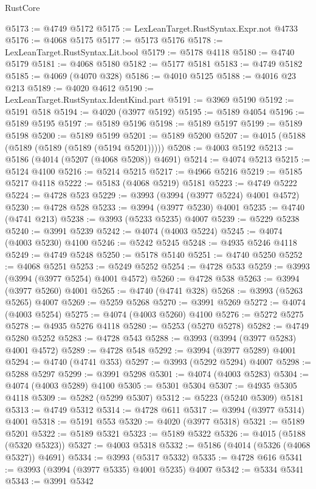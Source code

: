\begin{lexlean}{RustCore}
\begin{coremodule}
@5173 := @4749 @5172
@5175 := LexLeanTarget.RustSyntax.Expr.not @4733
@5176 := @4068 @5175
@5177 := @5173 @5176
@5178 := LexLeanTarget.RustSyntax.Lit.bool
@5179 := @5178 @4118
@5180 := @4740 @5179
@5181 := @4068 @5180
@5182 := @5177 @5181
@5183 := @4749 @5182
@5185 := @4069 (@4070 @328)
@5186 := @4010 @5125
@5188 := @4016 @23 @213
@5189 := @4020 @4612
@5190 := LexLeanTarget.RustSyntax.IdentKind.part
@5191 := @3969 @5190
@5192 := @5191 @518
@5194 := @4020 (@3977 @5192)
@5195 := @5189 @4054
@5196 := @5189 @5195
@5197 := @5189 @5196
@5198 := @5189 @5197
@5199 := @5189 @5198
@5200 := @5189 @5199
@5201 := @5189 @5200
@5207 := @4015 (@5188 (@5189 (@5189 (@5189 (@5194 @5201)))))
@5208 := @4003 @5192
@5213 := @5186 (@4014 (@5207 (@4068 @5208)) @4691)
@5214 := @4074 @5213
@5215 := @5124 @4100
@5216 := @5214 @5215
@5217 := @4966 @5216
@5219 := @5185 @5217 @4118
@5222 := @5183 (@4068 @5219) @5181
@5223 := @4749 @5222
@5224 := @4728 @523
@5229 := @3993 (@3994 (@3977 @5224) @4001 @4572)
@5230 := @4728 @528
@5233 := @3994 (@3977 @5230) @4001
@5235 := @4740 (@4741 @213)
@5238 := @3993 (@5233 @5235) @4007
@5239 := @5229 @5238
@5240 := @3991 @5239
@5242 := @4074 (@4003 @5224)
@5245 := @4074 (@4003 @5230) @4100
@5246 := @5242 @5245
@5248 := @4935 @5246 @4118
@5249 := @4749 @5248
@5250 := @5178 @5140
@5251 := @4740 @5250
@5252 := @4068 @5251
@5253 := @5249 @5252
@5254 := @4728 @533
@5259 := @3993 (@3994 (@3977 @5254) @4001 @4572)
@5260 := @4728 @538
@5263 := @3994 (@3977 @5260) @4001
@5265 := @4740 (@4741 @328)
@5268 := @3993 (@5263 @5265) @4007
@5269 := @5259 @5268
@5270 := @3991 @5269
@5272 := @4074 (@4003 @5254)
@5275 := @4074 (@4003 @5260) @4100
@5276 := @5272 @5275
@5278 := @4935 @5276 @4118
@5280 := @5253 (@5270 @5278)
@5282 := @4749 @5280 @5252
@5283 := @4728 @543
@5288 := @3993 (@3994 (@3977 @5283) @4001 @4572)
@5289 := @4728 @548
@5292 := @3994 (@3977 @5289) @4001
@5294 := @4740 (@4741 @353)
@5297 := @3993 (@5292 @5294) @4007
@5298 := @5288 @5297
@5299 := @3991 @5298
@5301 := @4074 (@4003 @5283)
@5304 := @4074 (@4003 @5289) @4100
@5305 := @5301 @5304
@5307 := @4935 @5305 @4118
@5309 := @5282 (@5299 @5307)
@5312 := @5223 (@5240 @5309) @5181
@5313 := @4749 @5312
@5314 := @4728 @611
@5317 := @3994 (@3977 @5314) @4001
@5318 := @5191 @553
@5320 := @4020 (@3977 @5318)
@5321 := @5189 @5201
@5322 := @5189 @5321
@5323 := @5189 @5322
@5326 := @4015 (@5188 (@5320 @5323))
@5327 := @4003 @5318
@5332 := @5186 (@4014 (@5326 (@4068 @5327)) @4691)
@5334 := @3993 (@5317 @5332)
@5335 := @4728 @616
@5341 := @3993 (@3994 (@3977 @5335) @4001 @5235) @4007
@5342 := @5334 @5341
@5343 := @3991 @5342

\end{coremodule}
\end{lexlean}
